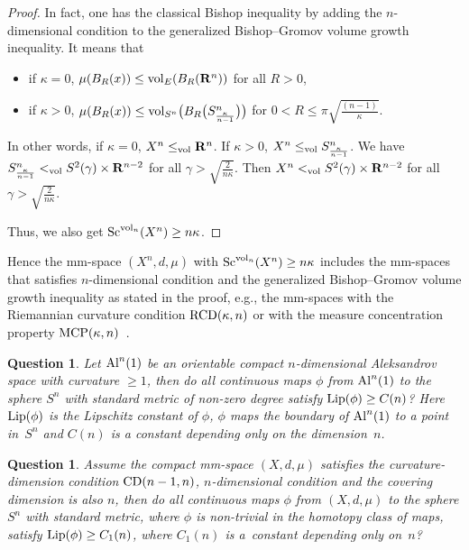\documentclass[pdftex]{sigma}
\newtheorem{Question}[Theorem]{Question}
\begin{document}
\begin{proof}
In fact, one has the classical Bishop inequality by adding the $n$-dimensional condition to the generalized Bishop--Gromov volume growth inequality. It means that
\begin{itemize}\itemsep=0pt
\item if $\kappa=0$, $\mu(B_R(x))\leq {\rm vol}_E(B_R(\mathbf{R}^n))$ for all $R>0$,
\item if $\kappa>0$, $\mu(B_R(x))\leq {\rm vol}_{S^n}\big(B_R\big(S^n_{\frac{\kappa}{n-1}}\big)\big)$ for $0< R\leq \pi \sqrt{\frac{(n-1)}{\kappa}}$.
\end{itemize}
In other words, if $\kappa=0$, $X^n\leq_{\rm vol}\mathbf{R}^n$. If $\kappa>0$, $X^n\leq_{\rm vol}S^n_{\frac{\kappa}{n-1}}$. We have $S^n_{\frac{\kappa}{n-1}}<_{\rm vol} S^2(\gamma)\times \mathbf{R}^{n-2}$ for all $\gamma>\sqrt{\frac{2}{n\kappa}}$. Then $X^n<_{\rm vol} S^2(\gamma)\times \mathbf{R}^{n-2}$ for all $\gamma>\sqrt{\frac{2}{n\kappa}}$.

 Thus, we also get ${\rm Sc}^{{\rm vol}_n}(X^n)\geq n\kappa$.
\end{proof}

\begin{Remark}
Hence the mm-space $(X^n, d, \mu)$ with ${\rm Sc}^{{\rm vol}_n}(X^n)\geq n\kappa$ includes the mm-spaces that satisfies $n$-dimensional condition and the generalized Bishop--Gromov volume growth inequality as stated in the proof, e.g., the mm-spaces with the Riemannian curvature condition ${\rm RCD}(\kappa,n)$ \cite{MR3205729} or with the measure concentration property ${\rm MCP}(\kappa,n)$~\cite{MR2341840}.
\end{Remark}

\begin{Question}Let ${\rm Al}^n(1)$ be an orientable compact $n$-dimensional Aleksandrov space with curvature $\geq 1$, then do all continuous maps $\phi$ from ${\rm Al}^n(1)$ to the sphere $S^n$ with standard metric of non-zero degree satisfy ${\rm Lip}(\phi)\geq C(n)$? Here ${\rm Lip}(\phi)$ is the Lipschitz constant of $\phi$, $\phi$ maps the boundary of ${\rm Al}^n(1)$ to a point in~$S^n$ and $C(n)$ is a constant depending only on the dimension~$n$.
\end{Question}

\begin{Question}Assume the compact mm-space $(X, d, \mu)$ satisfies the curvature-dimension condition ${\rm CD}(n-1, n)$, $n$-dimensional condition and the covering dimension is also $n$, then do all continuous maps $\phi$ from $(X, d, \mu)$ to the sphere $S^n$ with standard metric, where $\phi$ is non-trivial in the homotopy class of maps, satisfy ${\rm Lip}(\phi)\geq C_1(n)$, where $C_1(n)$ is a~constant depending only on~$n$?
\end{Question}
\end{document}
